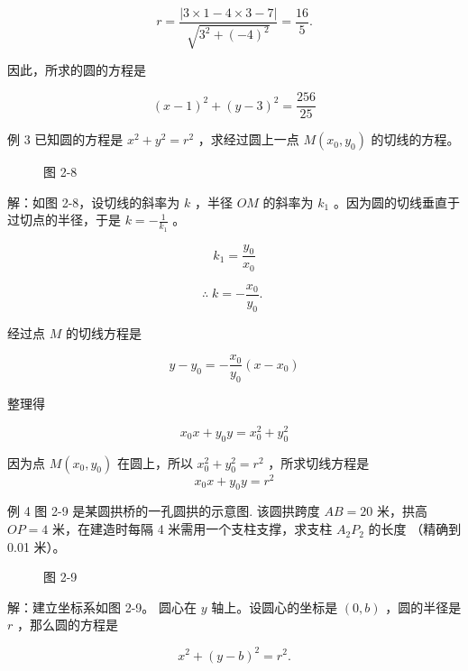 \documentclass[lang=cn,newtx,12pt,scheme=chinese]{elegantbook}
\begin{document}
\[
  r = \frac{\left| 3 \times 1 - 4 \times 3 - 7\right| }{\sqrt{{3}^{2} + {\left( -4\right) }^{2}}} = \frac{16}{5}.
\]

因此，所求的圆的方程是

\[
    {\left( x - 1\right) }^{2} + {\left( y - 3\right) }^{2} = \frac{256}{25}
\]

例 3  已知圆的方程是 \({x}^{2} + {y}^{2} = {r}^{2}\) ，求经过圆上一点 \(M\left( {{x}_{0},{y}_{0}}\right)\) 的切线的方程。

\begin{figure}[h]
	\centering
	
	\caption{图 2-8}
\end{figure}

解：如图 2-8，设切线的斜率为 \(k\) ，半径 \({OM}\) 的斜率为 \({k}_{1}\) 。因为圆的切线垂直于过切点的半径，于是 \(k = - \frac{1}{{k}_{1}}\) 。

\[
    {k}_{1} = \frac{{y}_{0}}{{x}_{0}}
\]

\[
  \therefore \;k = - \frac{{x}_{0}}{{y}_{0}}\text{. }
\]

经过点 \(M\) 的切线方程是

\[
  y - {y}_{0} = - \frac{{x}_{0}}{{y}_{0}}\left( {x - {x}_{0}}\right)
\]

整理得

\[
    {x}_{0}x + {y}_{0}y = {x}_{0}^{2} + {y}_{0}^{2}
\]

\begin{corollary}[切线方程]
因为点 \(M\left( {{x}_{0},{y}_{0}}\right)\) 在圆上，所以 \({x}_{0}^{2} + {y}_{0}^{2} = {r}^{2}\) ，所求切线方程是
\[
    {x}_{0}x + {y}_{0}y = {r}^{2}
\]
\end{corollary}

例 4     图 2-9 是某圆拱桥的一孔圆拱的示意图. 该圆拱跨度 \({AB} = {20}\) 米，拱高 \({OP} = 4\) 米，在建造时每隔 4 米需用一个支柱支撑，求支柱 \({A}_{2}{P}_{2}\) 的长度 （精确到 0.01 米）。

\begin{figure}[h]
	\centering
	
	\caption{图 2-9}
\end{figure}

解：建立坐标系如图 2-9。 圆心在 \(y\) 轴上。设圆心的坐标是 \(\left( {0,b}\right)\) ，圆的半径是 \(r\) ，那么圆的方程是

\[
    {x}^{2} + {\left( y - b\right) }^{2} = {r}^{2}.
\]
\end{document}
